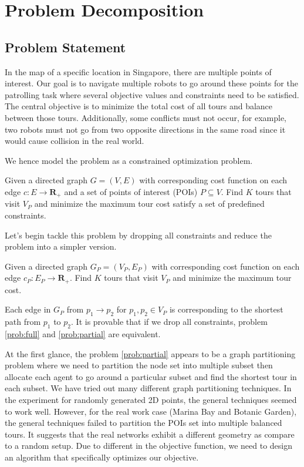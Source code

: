 \chapter{Problem Decomposition}

\section{Problem Statement}

In the map of a specific location in Singapore, there are multiple points of interest. Our goal is to navigate multiple robots to go around these points for the patrolling task where several objective values and constraints need to be satisfied. The central objective is to minimize the total cost of all tours and balance between those tours. Additionally, some conflicts must not occur, for example, two robots must not go from two opposite directions in the same road since it would cause collision in the real world.

We hence model the problem as a constrained optimization problem.

\begin{problem}
Given a directed graph $G = (V, E)$ with corresponding cost function on each edge $c: E \to \mathbf{R_+}$ and a set of points of interest (POIs) $P \subseteq V$. Find $K$ tours that visit $V_P$ and minimize the maximum tour cost satisfy a set of predefined constraints.
\label{prob:full}
\end{problem}

Let's begin tackle this problem by dropping all constraints and reduce the problem into a simpler version.

\begin{problem}
Given a directed graph $G_P = (V_P, E_P)$ with corresponding cost function on each edge $c_P: E_P \to \mathbf{R_+}$. Find $K$ tours that visit $V_P$ and minimize the maximum tour cost.
\label{prob:partial}
\end{problem}

Each edge in $G_P$ from $p_1 \to p_2$ for $p_1, p_2 \in V_P$ is corresponding to the shortest path from $p_1$ to $p_2$. It is provable that if we drop all constraints, problem \ref{prob:full} and \ref{prob:partial} are equivalent.

At the first glance, the problem \ref{prob:partial} appears to be a graph partitioning problem where we need to partition the node set into multiple subset then allocate each agent to go around a particular subset and find the shortest tour in each subset. We have tried out many different graph partitioning techniques. In the experiment for randomly generated 2D points, the general techniques seemed to work well. However, for the real work case (Marina Bay and Botanic Garden), the general techniques failed to partition the POIs set into multiple balanced tours. It suggests that the real networks exhibit a different geometry as compare to a random setup. Due to different in the objective function, we need to design an algorithm that specifically optimizes our objective.


